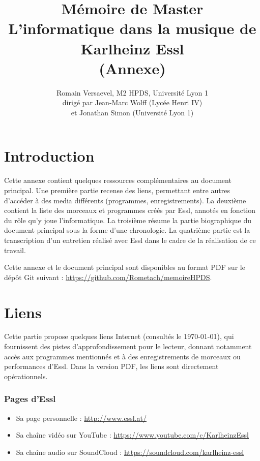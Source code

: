 \documentclass[a4paper,12pt]{article}
\title{\Large Mémoire de Master \\ \LARGE L'informatique dans la musique de Karlheinz Essl\\
(Annexe)}
\author{\normalsize Romain Versaevel, M2 HPDS, Université Lyon 1\\
\normalsize dirigé par Jean-Marc Wolff (Lycée Henri IV) \\
\normalsize et Jonathan Simon (Université Lyon 1)}
\begin{document}
\maketitle
\newpage

\tableofcontents

\newpage
\section{Introduction}

Cette annexe contient quelques ressources complémentaires au document principal. Une première partie recense des liens, permettant entre autres d'accéder à des media différents (programmes, enregistrements). La deuxième contient la liste des morceaux et programmes créés par Essl, annotés en fonction du rôle qu'y joue l'informatique. La troisième résume la partie biographique du document principal sous la forme d'une chronologie. La quatrième partie est la transcription d'un entretien réalisé avec Essl dans le cadre de la réalisation de ce travail.

Cette annexe et le document principal sont disponibles au format PDF sur le dépôt Git suivant :
\href{https://github.com/Rometach/memoireHPDS}{https://github.com/Rometach/memoireHPDS}.

\newpage
\section{Liens}

Cette partie propose quelques liens Internet (consultés le \today), qui fournissent des pistes d'approfondissement pour le lecteur, donnant notamment accès aux programmes mentionnés et à des enregistrements de morceaux ou performances d'Essl. Dans la version PDF, les liens sont directement opérationnels.

\subsubsection*{Pages d'Essl}

\begin{itemize}
\item Sa page personnelle : \href{http://www.essl.at/}{http://www.essl.at/}
\item Sa chaîne vidéo sur YouTube : \href{https://www.youtube.com/c/KarlheinzEssl}{https://www.youtube.com/c/KarlheinzEssl}
\item Sa chaîne audio sur SoundCloud : \href{https://soundcloud.com/karlheinz-essl}{https://soundcloud.com/karlheinz-essl}
\end{itemize}
\end{document}
